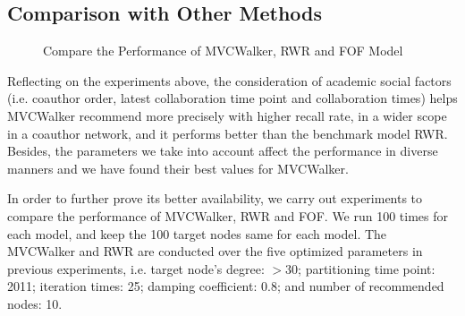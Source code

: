 \documentclass[10pt,journal,compsoc]{IEEEtran}
\begin{document}
\subsection{Comparison with Other Methods}

\begin{figure}
{}
\caption{Compare the Performance of MVCWalker, RWR and FOF Model}
\label{fig:9}       %
\end{figure}

Reflecting on the experiments above, the consideration of academic social factors (i.e. coauthor order, latest collaboration time point and collaboration times) helps MVCWalker recommend more precisely with higher recall rate, in a wider scope in a coauthor network, and it performs better than the benchmark model RWR. Besides, the parameters we take into account affect the performance in diverse manners and we have found their best values for MVCWalker.

In order to further prove its better availability, we carry out experiments to compare the performance of MVCWalker, RWR and FOF. We run 100 times for each model, and keep the 100 target nodes same for each model. The MVCWalker and RWR are conducted over the five optimized parameters in previous experiments, i.e. target node's degree: $>30$; partitioning time point: 2011; iteration times: 25; damping coefficient: 0.8; and number of recommended nodes: 10.
\end{document}
